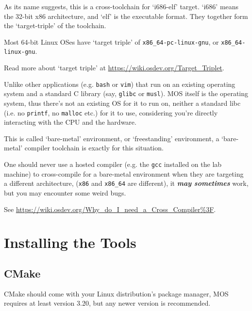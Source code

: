 As its name suggests, this is a cross-toolchain for `i686-elf' target. `i686' means the 32-bit
x86 architecture, and `elf' is the executable format. They together form the `target-triple' of
the toolchain.

\begin{tip}
    \item Most 64-bit Linux OSes have `target triple' of \texttt{x86\_64-pc-linux-gnu}, or
    \texttt{x86\_64-linux-gnu}.
    \item Read more about `target triple' at \url{https://wiki.osdev.org/Target_Triplet}.
\end{tip}

Unlike other applications (e.g. \texttt{bash} or \texttt{vim}) that run on an existing
operating system and a standard C library (say, \texttt{glibc} or \texttt{musl}). MOS itself is
the operating system, thus there's not an existing OS for it to run on, neither a standard libc
(i.e. no \texttt{printf}, no \texttt{malloc} etc.) for it to use, considering you're directly
interacting with the CPU and the hardware.

This is called `bare-metal' environment, or `freestanding' environment, a `bare-metal' compiler
toolchain is exactly for this situation.

\begin{warning}
    \item One should never use a hosted compiler (e.g. the \texttt{gcc} installed on the lab machine)
    to cross-compile for a bare-metal environment when they are targeting a different architecture,
    (\texttt{x86} and \texttt{x86\_64} are different), it \textit{\textbf{may sometimes}} work, but
    you may encounter some weird bugs.

    \item See \url{https://wiki.osdev.org/Why_do_I_need_a_Cross_Compiler%3F}.
\end{warning}

\section{Installing the Tools}

\subsection{CMake} \label{sec:cmake-install}

CMake should come with your Linux distribution's package manager, MOS requires at least version
3.20, but any newer version is recommended.

